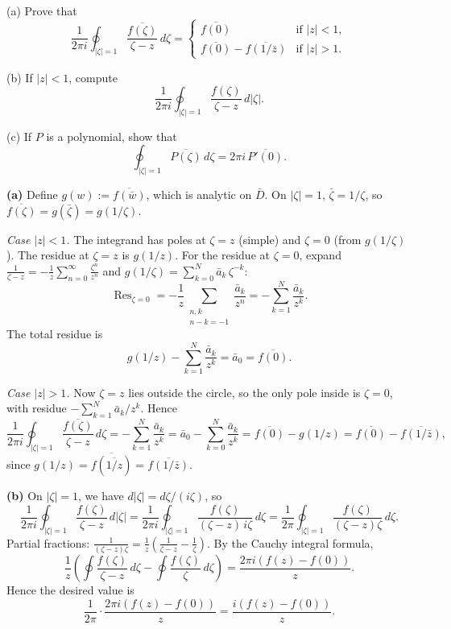 \documentclass{article}
\begin{document}
(a) Prove that
\[
  \frac{1}{2\pi i}\oint_{|\zeta|=1}
  \frac{\overline{f(\zeta)}}{\zeta - z}\,d\zeta
  =
  \begin{cases}
    \overline{f(0)} & \text{if } |z| < 1,\\
    \overline{f(0)} - \overline{f(1/\bar{z})} & \text{if } |z| > 1.
  \end{cases}
\]

(b) If $|z| < 1$, compute
\[
  \frac{1}{2\pi i}\oint_{|\zeta|=1}
  \frac{f(\zeta)}{\zeta - z}\,d|\zeta|.
\]

(c) If $P$ is a polynomial, show that
\[
  \oint_{|\zeta|=1} \overline{P(\zeta)}\,d\zeta
  = 2\pi i\,\overline{P'(0)}.
\]

\begin{solution}
  \textbf{(a)}\;
  Define $g(w) := \overline{f(\bar{w})}$, which is analytic on
  $\bar{D}$.
  On $|\zeta|=1$, $\bar\zeta = 1/\zeta$, so
  $\overline{f(\zeta)} = g(\bar\zeta) = g(1/\zeta)$.

  \smallskip

  \textit{Case $|z|<1$.}\;
  The integrand has poles at $\zeta = z$ (simple) and
  $\zeta = 0$ (from $g(1/\zeta)$).
  The residue at $\zeta = z$ is $g(1/z)$.
  For the residue at $\zeta = 0$, expand
  $\frac{1}{\zeta-z} = -\frac{1}{z}\sum_{n=0}^{\infty}
  \frac{\zeta^n}{z^n}$ and $g(1/\zeta)
  = \sum_{k=0}^{N}\bar{a}_k\,\zeta^{-k}$:
  \[
    \operatorname{Res}_{\zeta=0}
    = -\frac{1}{z}\sum_{\substack{n,k\\ n-k=-1}}
    \frac{\bar{a}_k}{z^n}
    = -\sum_{k=1}^{N}\frac{\bar{a}_k}{z^k}.
  \]
  The total residue is
  \[
    g(1/z) - \sum_{k=1}^{N}\frac{\bar{a}_k}{z^k}
    = \bar{a}_0 = \overline{f(0)}.
  \]

  \smallskip

  \textit{Case $|z|>1$.}\;
  Now $\zeta = z$ lies outside the circle, so the only pole
  inside is $\zeta = 0$, with residue
  $-\sum_{k=1}^{N}\bar{a}_k/z^k$.
  Hence
  \[
    \frac{1}{2\pi i}\oint_{|\zeta|=1}
    \frac{\overline{f(\zeta)}}{\zeta-z}\,d\zeta
    = -\sum_{k=1}^{N}\frac{\bar{a}_k}{z^k}
    = \bar{a}_0 - \sum_{k=0}^{N}\frac{\bar{a}_k}{z^k}
    = \overline{f(0)} - g(1/z)
    = \overline{f(0)} - \overline{f(1/\bar{z})},
  \]
  since $g(1/z) = \overline{f(\overline{1/z})}
  = \overline{f(1/\bar{z})}$.

  \medskip

  \textbf{(b)}\;
  On $|\zeta|=1$, we have $d|\zeta| = d\zeta/(i\zeta)$, so
  \[
    \frac{1}{2\pi i}\oint_{|\zeta|=1}
    \frac{f(\zeta)}{\zeta-z}\,d|\zeta|
    = \frac{1}{2\pi i}\oint_{|\zeta|=1}
    \frac{f(\zeta)}{(\zeta-z)\,i\zeta}\,d\zeta
    = \frac{1}{2\pi}\oint_{|\zeta|=1}
    \frac{f(\zeta)}{(\zeta-z)\zeta}\,d\zeta.
  \]
  Partial fractions:
  $\frac{1}{(\zeta-z)\zeta}
  = \frac{1}{z}\!\left(\frac{1}{\zeta-z}-\frac{1}{\zeta}\right)$.
  By the Cauchy integral formula,
  \[
    \frac{1}{z}\!\left(
      \oint\frac{f(\zeta)}{\zeta-z}\,d\zeta
      -\oint\frac{f(\zeta)}{\zeta}\,d\zeta
    \right)
    = \frac{2\pi i(f(z)-f(0))}{z}.
  \]
  Hence the desired value is
  \[
    \frac{1}{2\pi}\cdot\frac{2\pi i(f(z)-f(0))}{z}
    = \frac{i(f(z)-f(0))}{z}.
  \]


\end{solution}
\end{document}

